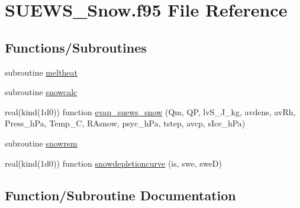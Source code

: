 \hypertarget{_s_u_e_w_s___snow_8f95}{}\section{S\+U\+E\+W\+S\+\_\+\+Snow.\+f95 File Reference}
\label{_s_u_e_w_s___snow_8f95}
\subsection*{Functions/\+Subroutines}
\begin{DoxyCompactItemize}
\item 
subroutine \hyperlink{_s_u_e_w_s___snow_8f95_ab4ce449365f2ed93c920c5629a3ca469}{meltheat}
\item 
subroutine \hyperlink{_s_u_e_w_s___snow_8f95_a2035fba82c9957964a34a3e537c5de1e}{snowcalc}
\item 
real(kind(1d0)) function \hyperlink{_s_u_e_w_s___snow_8f95_a9a6eef1115e244dd61907d3add27bc23}{evap\+\_\+suews\+\_\+snow} (Qm, QP, lv\+S\+\_\+\+J\+\_\+kg, avdens, av\+Rh, Press\+\_\+h\+Pa, Temp\+\_\+C, R\+Asnow, psyc\+\_\+h\+Pa, tstep, avcp, s\+Ice\+\_\+h\+Pa)
\item 
subroutine \hyperlink{_s_u_e_w_s___snow_8f95_ac76e6991de3d894a499934a93dd61744}{snowrem}
\item 
real(kind(1d0)) function \hyperlink{_s_u_e_w_s___snow_8f95_a76dc69984f9ab4bba4b6c7b76ca9f497}{snowdepletioncurve} (is, swe, sweD)
\end{DoxyCompactItemize}


\subsection{Function/\+Subroutine Documentation}
\mbox{\label{_s_u_e_w_s___snow_8f95_a9a6eef1115e244dd61907d3add27bc23}} 
